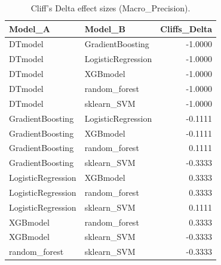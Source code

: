 \begin{table}[t]
\centering
\begin{tabular}{llr}
\toprule
Model_A & Model_B & Cliffs_Delta \\
\midrule
DTmodel & GradientBoosting & -1.0000 \\
DTmodel & LogisticRegression & -1.0000 \\
DTmodel & XGBmodel & -1.0000 \\
DTmodel & random_forest & -1.0000 \\
DTmodel & sklearn_SVM & -1.0000 \\
GradientBoosting & LogisticRegression & -0.1111 \\
GradientBoosting & XGBmodel & -0.1111 \\
GradientBoosting & random_forest & 0.1111 \\
GradientBoosting & sklearn_SVM & -0.3333 \\
LogisticRegression & XGBmodel & 0.3333 \\
LogisticRegression & random_forest & 0.3333 \\
LogisticRegression & sklearn_SVM & 0.1111 \\
XGBmodel & random_forest & 0.3333 \\
XGBmodel & sklearn_SVM & -0.3333 \\
random_forest & sklearn_SVM & -0.3333 \\
\bottomrule
\end{tabular}
\caption{Cliff's Delta effect sizes (Macro_Precision).}
\label{tab:cliffs_Macro_Precision}
\end{table}